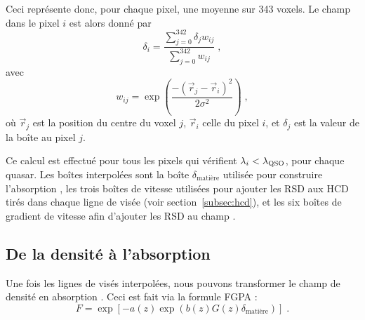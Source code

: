 Ceci représente donc, pour chaque pixel, une moyenne sur \num{343} voxels.
Le champ dans le pixel $i$ est alors donné par
\begin{equation}
  \delta_i = \frac{
    \sum\limits_{j=0}^{342} \delta_j w_{ij}
  }{
    \sum\limits_{j=0}^{342} w_{ij}
  } \; ,
\end{equation}
avec
\begin{equation}
  w_{ij} = \exp(\frac{
    -(\vec r_j - \vec r_i)^2
  }{
    2 \sigma^2
  }) \; ,
\end{equation}
où $\vec r_j$ est la position du centre du voxel $j$, $\vec r_i$ celle du pixel $i$, et  $\delta_j$ est la valeur de la boîte au pixel $j$.

Ce calcul est effectué pour tous les pixels qui vérifient $\lambda_i < \lambda_{\textsc{QSO}}$, pour chaque quasar. Les boîtes interpolées sont la boîte $\delta_{\mathrm{matière}}$ utilisée pour construire l'absorption \lya{}, les trois boîtes de vitesse utilisées pour ajouter les RSD aux HCD tirés dans chaque ligne de visée (voir section~\ref{subsec:hcd}), et les six boîtes de gradient de vitesse afin d'ajouter les RSD au champ \lya{}.


\subsection{De la densité à l'absorption}
\label{subsec:density2absorption}
Une fois les lignes de visés interpolées, nous pouvons transformer le champ de densité en absorption \lya{}. Ceci est fait via la formule FGPA :
\begin{equation}
  \label{eq:fgpa2}
  F = \exp\left[ - a(z) \exp(b(z) G(z) \delta_{\mathrm{matière}})\right] \;.  
\end{equation}

